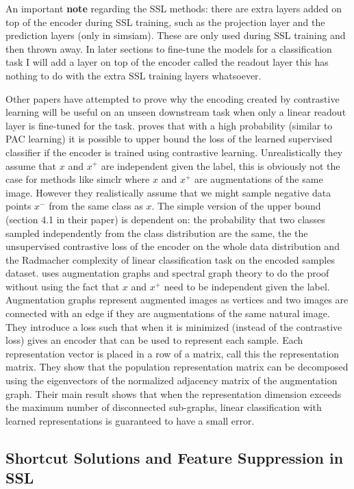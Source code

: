 \documentclass[../thesis.tex]{subfiles}
\begin{document}
	An important \textbf{note} regarding the SSL methods: there are extra layers added on top of the encoder during SSL training, such as the projection layer and the prediction layers (only in simsiam). These are only used during SSL training and then thrown away. In later sections to fine-tune the models for a classification task I will add a layer on top of the encoder called the readout layer this has nothing to do with the extra SSL training layers whatsoever.    
	
	Other papers have attempted to prove why the encoding created by contrastive learning will be useful on an unseen downstream task when only a linear readout layer is fine-tuned for the task. \cite{arora_theoretical_2019} proves that with a high probability (similar to PAC learning) it is possible to upper bound the loss of the learned supervised classifier if the encoder is trained using contrastive learning. Unrealistically they assume that $x$ and $x^+$ are independent given the label, this is obviously not the case for methods like simclr where $x$ and $x^+$ are augmentations of the same image. However they realistically assume that we might sample negative data points $x^-$  from the same class as $x$. The simple version of the upper bound (section 4.1 in their paper) is dependent on: the probability that two classes sampled independently from the class distribution are the same, the the unsupervised contrastive loss of the encoder on the whole data distribution and  the Radmacher complexity of linear classification task on the encoded samples dataset. \cite{contrastive_learning_spectral_proof} uses augmentation graphs and spectral graph theory to do the proof without using the fact that $x$ and $x^+$ need to be independent given the label. Augmentation graphs represent augmented images as vertices and two images are connected with an edge if they are augmentations of the same natural image. They introduce a loss such that when it is minimized (instead of the contrastive loss) gives an encoder that can be used to represent each sample. Each representation vector is placed in a row of a matrix, call this the representation matrix. They show that the population representation matrix can be decomposed using the eigenvectors of the normalized adjacency
matrix of the augmentation graph. Their main result shows that when the
representation dimension exceeds the maximum number of disconnected sub-graphs, linear classification with learned representations is guaranteed to have a small error.
	
	\subsection{Shortcut Solutions and Feature Suppression in SSL} 
	\label{sec:model_shortcuts}
	
\end{document}
